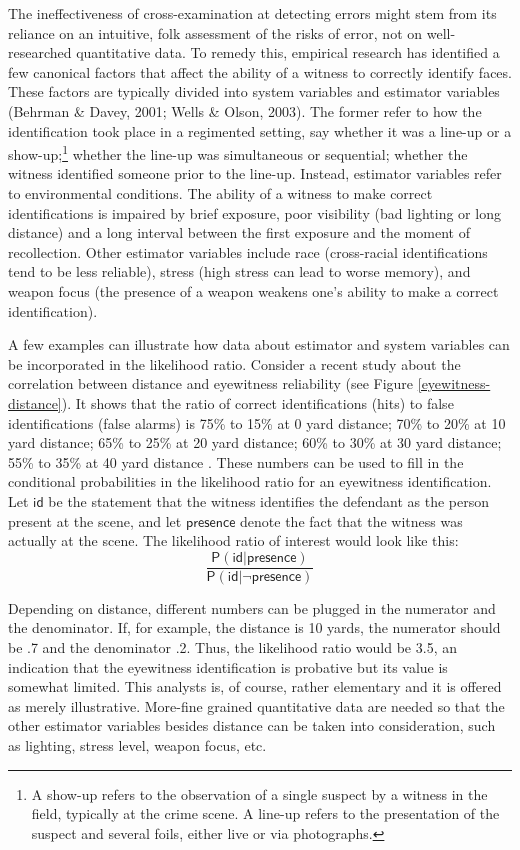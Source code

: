 \documentclass[
  10pt,
  dvipsnames,enabledeprecatedfontcommands]{scrartcl}
\newcommand{\pr}[1]{\mathsf{P}(#1)}
\begin{document}
The ineffectiveness of cross-examination at detecting errors might stem
from its reliance on an intuitive, folk assessment of the risks of
error, not on well-researched quantitative data. To remedy this,
empirical research has identified a few canonical factors that affect
the ability of a witness to correctly identify faces. These factors are
typically divided into system variables and estimator variables (Behrman
\& Davey, 2001; Wells \& Olson, 2003). The former refer to how the
identification took place in a regimented setting, say whether it was a
line-up or a
show-up;\footnote{A show-up refers to the observation of a single suspect by a witness in the field, typically at the crime scene. A line-up refers to the presentation of the suspect and several foils, either live or via photographs.}
whether the line-up was simultaneous or sequential; whether the witness
identified someone prior to the line-up. Instead, estimator variables
refer to environmental conditions. The ability of a witness to make
correct identifications is impaired by brief exposure, poor visibility
(bad lighting or long distance) and a long interval between the first
exposure and the moment of recollection. Other estimator variables
include race (cross-racial identifications tend to be less reliable),
stress (high stress can lead to worse memory), and weapon focus (the
presence of a weapon weakens one's ability to make a correct
identification).

A few examples can illustrate how data about estimator and system
variables can be incorporated in the likelihood ratio. Consider a recent
study about the correlation between distance and eyewitness reliability
(see Figure \ref{eyewitness-distance}). It shows that the ratio of
correct identifications (hits) to false identifications (false alarms)
is 75\% to 15\% at 0 yard distance; 70\% to 20\% at 10 yard distance;
65\% to 25\% at 20 yard distance; 60\% to 30\% at 30 yard distance; 55\%
to 35\% at 40 yard distance \citep{lampinen2014}. 
These numbers can be used to fill in the conditional probabilities in
the likelihood ratio for an eyewitness identification. Let
\(\textsf{id}\) be the statement that the witness identifies the
defendant as the person present at the scene, and let
\(\textsf{presence}\) denote the fact that the witness was actually at
the scene. The likelihood ratio of interest would look like this:
\[\frac{\pr{\textsf{id} \vert \textsf{presence}}}{\pr{\textsf{id} \vert \neg \textsf{presence}}}\]

\noindent Depending on distance, different numbers can be plugged in the
numerator and the denominator. If, for example, the distance is 10
yards, the numerator should be .7 and the denominator .2. Thus, the
likelihood ratio would be 3.5, an indication that the eyewitness
identification is probative but its value is somewhat limited. This
analysts is, of course, rather elementary and it is offered as merely
illustrative. More-fine grained quantitative data are needed so that the
other estimator variables besides distance can be taken into
consideration, such as lighting, stress level, weapon focus, etc.
\end{document}

